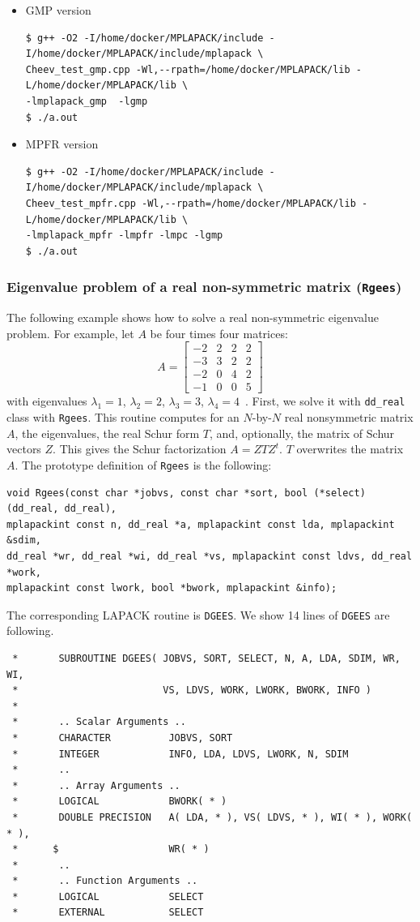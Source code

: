 \documentclass[12pt]{article}
\begin{document}
\begin{itemize}
\item GMP version
\begin{verbatim}
$ g++ -O2 -I/home/docker/MPLAPACK/include -I/home/docker/MPLAPACK/include/mplapack \
Cheev_test_gmp.cpp -Wl,--rpath=/home/docker/MPLAPACK/lib -L/home/docker/MPLAPACK/lib \
-lmplapack_gmp  -lgmp
$ ./a.out
\end{verbatim}
\item MPFR version
\begin{verbatim}
$ g++ -O2 -I/home/docker/MPLAPACK/include -I/home/docker/MPLAPACK/include/mplapack \
Cheev_test_mpfr.cpp -Wl,--rpath=/home/docker/MPLAPACK/lib -L/home/docker/MPLAPACK/lib \
-lmplapack_mpfr -lmpfr -lmpc -lgmp
$ ./a.out
\end{verbatim}
\end{itemize}
\subsubsection{Eigenvalue problem of a real non-symmetric matrix ({\tt Rgees})}

The following example shows how to solve a real non-symmetric eigenvalue problem. For example, let $A$ be four times four matrices:
\[
A = \left[\begin{array}{llll}-2 & 2 & 2 & 2 \\ -3 & 3 & 2 & 2 \\ -2 & 0 & 4 & 2 \\ -1 & 0 & 0 & 5\end{array}\right]
\]
with eigenvalues $\lambda_1 = 1$, $\lambda_2 = 2$, $\lambda_3 = 3$, $\lambda_4=4$~\cite{Gregory1969ACO}.
First, we solve it with {\tt dd\_real} class with {\tt Rgees}. This routine computes for an $N$-by-$N$
real nonsymmetric matrix $A$, the eigenvalues, the real Schur form $T$, and, optionally, the matrix of
Schur vectors $Z$. This gives the Schur factorization $A = Z T Z^t$. $ T$ overwrites the matrix $A$.
The prototype definition of {\tt Rgees} is the following:
\begin{verbatim}
void Rgees(const char *jobvs, const char *sort, bool (*select)(dd_real, dd_real),
mplapackint const n, dd_real *a, mplapackint const lda, mplapackint &sdim,
dd_real *wr, dd_real *wi, dd_real *vs, mplapackint const ldvs, dd_real *work,
mplapackint const lwork, bool *bwork, mplapackint &info);
\end{verbatim}
The corresponding LAPACK routine is {\tt DGEES}. We show 14 lines of {\tt DGEES} are following.
\begin{verbatim}
 *       SUBROUTINE DGEES( JOBVS, SORT, SELECT, N, A, LDA, SDIM, WR, WI,
 *                         VS, LDVS, WORK, LWORK, BWORK, INFO )
 *
 *       .. Scalar Arguments ..
 *       CHARACTER          JOBVS, SORT
 *       INTEGER            INFO, LDA, LDVS, LWORK, N, SDIM
 *       ..
 *       .. Array Arguments ..
 *       LOGICAL            BWORK( * )
 *       DOUBLE PRECISION   A( LDA, * ), VS( LDVS, * ), WI( * ), WORK( * ),
 *      $                   WR( * )
 *       ..
 *       .. Function Arguments ..
 *       LOGICAL            SELECT
 *       EXTERNAL           SELECT
\end{verbatim}
\end{document}

